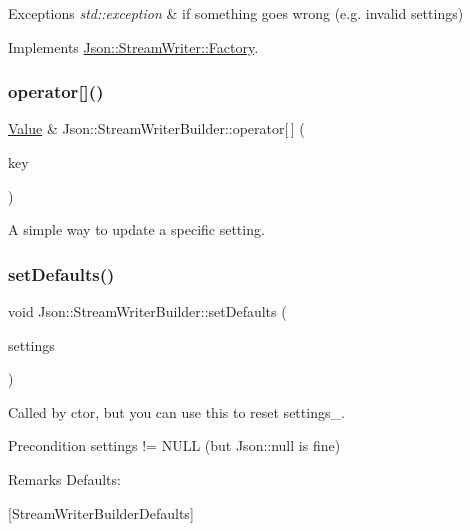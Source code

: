 \begin{DoxyExceptions}{Exceptions}
{\em std\+::exception} & if something goes wrong (e.\+g. invalid settings) \\
\hline
\end{DoxyExceptions}


Implements \hyperlink{classJson_1_1StreamWriter_1_1Factory_a9d30ec53e8288cd53befccf1009c5f31}{Json\+::\+Stream\+Writer\+::\+Factory}.

\mbox{\label{classJson_1_1StreamWriterBuilder_af68f6b59cb20b074052ed12bb3d336a3}} 
\subsubsection{\texorpdfstring{operator[]()}{operator[]()}}
{\footnotesize\ttfamily \hyperlink{classJson_1_1Value}{Value} \& Json\+::\+Stream\+Writer\+Builder\+::operator\mbox{[}$\,$\mbox{]} (\begin{DoxyParamCaption}\item[{J\+S\+O\+N\+C\+P\+P\+\_\+\+S\+T\+R\+I\+NG}]{key }\end{DoxyParamCaption})}

A simple way to update a specific setting. \mbox{\label{classJson_1_1StreamWriterBuilder_a53bf106b141e28637b01ad0ecd2acbf6}} 
\subsubsection{\texorpdfstring{set\+Defaults()}{setDefaults()}}
{\footnotesize\ttfamily void Json\+::\+Stream\+Writer\+Builder\+::set\+Defaults (\begin{DoxyParamCaption}\item[{\hyperlink{classJson_1_1Value}{Json\+::\+Value} $\ast$}]{settings }\end{DoxyParamCaption})\hspace{0.3cm}{\ttfamily [static]}}

Called by ctor, but you can use this to reset settings\+\_\+. \begin{DoxyPrecond}{Precondition}
\textquotesingle{}settings\textquotesingle{} != N\+U\+LL (but Json\+::null is fine) 
\end{DoxyPrecond}
\begin{DoxyRemark}{Remarks}
Defaults\+: 
\begin{DoxyCodeInclude}
\end{DoxyCodeInclude}

\end{DoxyRemark}
\mbox{[}Stream\+Writer\+Builder\+Defaults\mbox{]}

